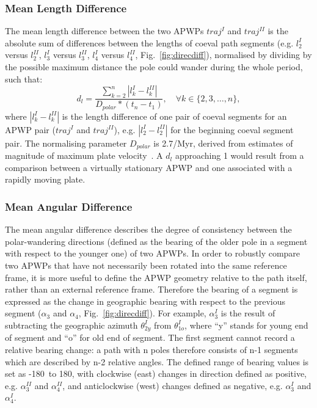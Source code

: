 \subsubsection{Mean Length Difference}
The mean length difference between the two APWPs $traj^I$ and $traj^{II}$ is the
absolute sum of differences between the lengths of coeval path segments (e.g.
$l_2^I$ versus $l_2^{II}$, $l_3^I$ versus $l_3^{II}$, $l_4^I$ versus $l_4^{II}$,
Fig.~\ref{fig:direcdiff}), normalised by dividing by the possible maximum
distance the pole could wander during the whole period, such that:
%
\begin{equation*}
  d_l = \frac{\sum\limits_{k=2}^n | l_k^I - l_k^{II} |}{D_{polar} * (t_n-t_1)} ,
  \quad\forall k \in \{2,3,\ldots,n\},
\label{eq:ld}
\end{equation*}
%
where $|l_k^I - l_k^{II}|$ is the length difference of one pair of coeval
segments for an APWP pair ($traj^I$ and $traj^{II}$), e.g. $|l_2^I - l_2^{II}|$
for the beginning coeval segment pair. The normalising parameter $D_{polar}$ is
2.7\degree/Myr, derived from estimates of magnitude of maximum plate
velocity~\cite[up to about 30 cm/year]{S09,K14}. A $d_l$ approaching 1 would
result from a comparison between a virtually stationary APWP and one associated
with a rapidly moving plate.

\subsubsection{Mean Angular Difference}

The mean angular difference describes the degree of consistency between the
polar-wandering directions (defined as the bearing of the older pole in a
segment with respect to the younger one) of two APWPs. In order to robustly
compare two APWPs that have not necessarily been rotated into the same reference
frame, it is more useful to define the APWP geometry relative to the path
itself, rather than an external reference frame. Therefore the bearing of a
segment is expressed as the change in geographic bearing with respect to the
previous segment ($\alpha_3$ and $\alpha_4$, Fig.~\ref{fig:direcdiff}). For
example, $\alpha_3^I$ is the result of subtracting the geographic azimuth
$\theta_{2y}^I$ from $\theta_{1o}^I$, where ``y'' stands for young end of
segment and ``o'' for old end of segment. The first segment cannot record a
relative bearing change: a path with n poles therefore consists of n-1 segments
which are described by n-2 relative angles. The defined range of bearing values
is set as -180\degree\ to 180\degree, with clockwise (east) changes in direction
defined as positive, e.g. {\bf $\alpha_3^{II}$} and {\bf $\alpha_4^{II}$}, and
anticlockwise (west) changes defined as negative, e.g. {\bf $\alpha_3^I$} and
{\bf $\alpha_4^I$}.

